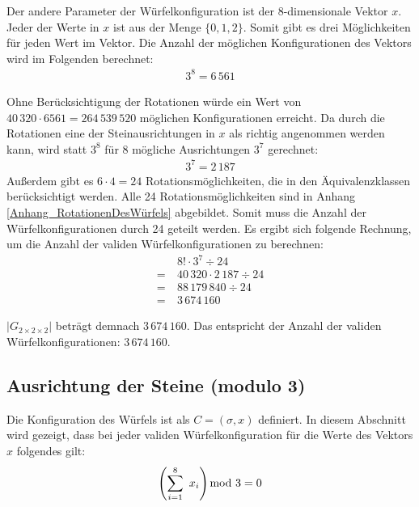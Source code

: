 \documentclass[12pt,a4paper, usenames, dvipsnames]{article}
\theoremstyle{mystyle}
\theoremstyle{definition}
\newcommand{\Gtwo}{\ensuremath{G_{2\times 2\times 2}}}
\begin{document}
Der andere Parameter der Würfelkonfiguration ist der 8-dimensionale Vektor $x$. Jeder der Werte in $x$ ist aus der Menge $\{0,1,2\}$. Somit gibt es drei Möglichkeiten für jeden Wert im Vektor. Die Anzahl der möglichen Konfigurationen des Vektors wird im Folgenden berechnet:
\begin{align*}
3^8 = 6 \, 561
\end{align*}

Ohne Berücksichtigung der Rotationen würde ein Wert von $40 \, 320 \cdot 6561 = 264 \, 539 \, 520$ möglichen Konfigurationen erreicht. 
Da durch die Rotationen eine der Steinausrichtungen in $x$ als richtig angenommen werden kann, wird  statt $3^8$ für 8 mögliche Ausrichtungen $3^7$ gerechnet:
\begin{align*}
3^7 = 2 \, 187
\end{align*}
Außerdem gibt es $6 \cdot 4 = 24$ Rotationsmöglichkeiten, die in den Äquivalenzklassen berücksichtigt werden. Alle 24 Rotationsmöglichkeiten sind in Anhang \ref{Anhang_RotationenDesWürfels} abgebildet.  Somit muss die Anzahl der Würfelkonfigurationen durch 24 geteilt werden. Es ergibt sich folgende Rechnung, um die Anzahl der validen Würfelkonfigurationen zu berechnen:
\begin{align*}
& 8! \cdot 3^7 \div 24 \\
= \ & 40 \, 320 \cdot 2 \, 187 \div 24 \\
= \ & 88 \, 179 \, 840 \div 24 \\
= \ & 3\, 674\, 160
\end{align*}

$|\Gtwo|$ beträgt demnach $3\, 674\, 160$.
Das entspricht der Anzahl der validen Würfelkonfigurationen: $3\, 674\, 160$.



%
%
%
%
%
%
%
%
%
%
%
%
%
%
%
%
%
%
%
%
\subsection{Ausrichtung der Steine (modulo 3)}

\label{Abschnitt_Modulo3}

Die Konfiguration des Würfels ist als $C=(\sigma, x)$ definiert. In diesem Abschnitt wird gezeigt, dass bei jeder validen Würfelkonfiguration für die Werte des Vektors $x$ folgendes gilt: 
\begin{displaymath}
\left( \sum_{i= 1}^{8} \ x_i \right) \hspace*{-0.7em} \mod 3 = 0 
\end{displaymath} 
\end{document}
